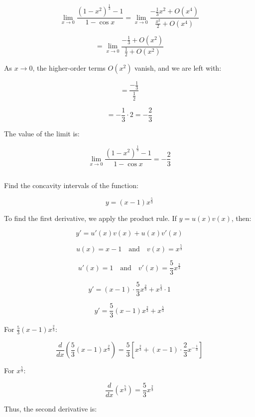 \documentclass{article}
\begin{document}
	\[
	\lim_{x \to 0} \frac{{(1-x^2)}^{\frac{1}{3}} - 1}{1 - \cos x} = \lim_{x \to 0} \frac{-\frac{1}{3}x^2 + O(x^4)}{\frac{x^2}{2} + O(x^4)}
	\]
	

	\[
	= \lim_{x \to 0} \frac{-\frac{1}{3} + O(x^2)}{\frac{1}{2} + O(x^2)}
	\]
	
	As \( x \to 0 \), the higher-order terms \( O(x^2) \) vanish, and we are left with:
	
	\[
	= \frac{-\frac{1}{3}}{\frac{1}{2}}
	\]
	

	
	
	\[
	= -\frac{1}{3} \cdot 2 = -\frac{2}{3}
	\]

	The value of the limit is:
	
	\[
	\lim_{x \to 0} \frac{{(1-x^2)}^{\frac{1}{3}} - 1}{1 - \cos x} = -\frac{2}{3}
	\]
	


\subsection{}
		


		Find the concavity intervals of the function:
		
		\[
		y = (x-1) x^{\frac{5}{3}}
		\]
		
		To find the first derivative, we apply the product rule. If \( y = u(x) v(x) \), then:
		
		\[
		y' = u'(x) v(x) + u(x) v'(x)
		\]
		
		\[
		u(x) = x - 1 \quad \text{and} \quad v(x) = x^{\frac{5}{3}}
		\]
		
		\[
		u'(x) = 1 \quad \text{and} \quad v'(x) = \frac{5}{3} x^{\frac{2}{3}}
		\]
		
		
		\[
		y' = (x - 1) \cdot \frac{5}{3} x^{\frac{2}{3}} + x^{\frac{5}{3}} \cdot 1
		\]
		
		
		\[
		y' = \frac{5}{3} (x - 1) x^{\frac{2}{3}} + x^{\frac{5}{3}}
		\]
		
		For \( \frac{5}{3} (x - 1) x^{\frac{2}{3}} \):
		
		\[
		\frac{d}{dx} \left( \frac{5}{3} (x - 1) x^{\frac{2}{3}} \right) = \frac{5}{3} \left[ x^{\frac{2}{3}} + (x - 1) \cdot \frac{2}{3} x^{-\frac{1}{3}} \right]
		\]
		
		For \( x^{\frac{5}{3}} \):
		
		\[
		\frac{d}{dx} \left( x^{\frac{5}{3}} \right) = \frac{5}{3} x^{\frac{2}{3}}
		\]
		
		Thus, the second derivative is:
		
\end{document}
